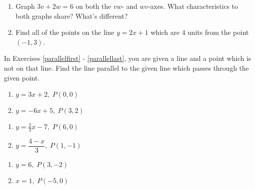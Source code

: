 \documentclass{ximera}
\begin{document}
\begin{enumerate}
\setcounter{enumi}{\value{HW}}

\item  Graph $3v + 2w = 6$ on both the $vw$- and $wv$-axes.  What characteristics to both graphs share?  What's different?

\item  Find all of the points on the line $y=2x+1$ which are $4$ units from the point $(-1,3)$.

\setcounter{HW}{\value{enumi}}
\end{enumerate}

In Exercises \ref{parallelfirst} - \ref{parallellast}, you are given a line and a point which is not on that line.  Find the line parallel to the given line which passes through the given point.


\begin{multicols}{2}
\begin{enumerate}
\setcounter{enumi}{\value{HW}}

\item $y = 3x + 2, \; P(0, 0)$ \label{parallelfirst}
\item $y = -6x + 5, \; P(3, 2)$

\setcounter{HW}{\value{enumi}}
\end{enumerate}
\end{multicols}


\begin{multicols}{2}
\begin{enumerate}
\setcounter{enumi}{\value{HW}}

\item $y = \frac{2}{3} x - 7, \; P(6, 0)$
\item $y = \dfrac{4-x}{3}, \; P(1, -1)$


\setcounter{HW}{\value{enumi}}
\end{enumerate}
\end{multicols}


\begin{multicols}{2}
\begin{enumerate}
\setcounter{enumi}{\value{HW}}

\item $y = 6, \; P(3, -2)$
\item $x=1, \; P(-5,0)$ \label{parallellast}


\setcounter{HW}{\value{enumi}}
\end{enumerate}
\end{multicols}
\end{document}
